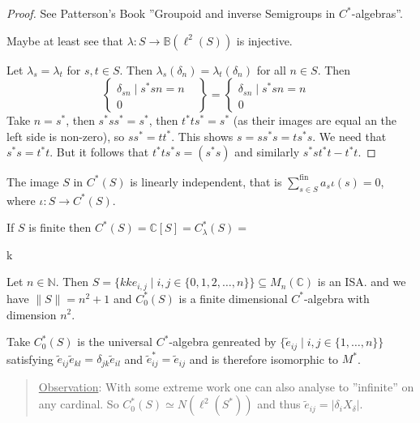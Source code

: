 \documentclass[a4paper]{article}
\begin{document}
\begin{proof}
	See Patterson's Book ''Groupoid and inverse Semigroups in $C^*$-algebras''.

	Maybe at least see that $\lambda: S \to \mathds{B}(\ell^2(S))$ is injective.

	Let $\lambda_s = \lambda_t$ for $s,t \in S$.
	Then $\lambda_s (\delta_n) = \lambda_t(\delta_n)$ for all $n \in S$.
	Then
	\begin{equation*}
		\left\{ \begin{matrix}
			\delta_{sn} \mid s^*sn = n \\ 0 & 
		\end{matrix}\right\} = \left\{ \begin{matrix}
			\delta_{sn} \mid s^*sn = n \\ 0 & 
		\end{matrix} \right.
	\end{equation*}	
	Take $n = s^*$, then $s^* s s^* = s^*$, then $t^*ts^* = s^*$ (as their images are equal an the left side is non-zero), so $ss^* = tt^*$.
	This shows $s = ss^*s= t s^* s$.
	We need that $s^*s = t^*t$.
	But it follows that $t^* t s^* s = (s^* s)$ and similarly $s^*s t^*t - t^* t$.
\end{proof}

\begin{corollary}
	The image $S$ in $C^*(S)$ is linearly independent, that is $\sum_{s \in S}^\mathrm{fin} a_s \iota(s) = 0$, where $\iota: S \to C^*(S)$.
\end{corollary}

\begin{corollary}
	If $S$ is finite then $C^*(S) = \mathds{C}[S] = C_\lambda^*(S) = $ 
\end{corollary}k

\begin{example}
	Let $n \in \mathds{N}$.
	Then $S = \{kke_{i,j} \mid i,j \in \{0, 1, 2, \dots,n   \} \}\subseteq M_n(\mathds{C})$ is an ISA. and we have $\|S\| = n^2 + 1$ and $C_0^*(S)$ is a finite dimensional $C^*$-algebra with dimension $n^2$.

	Take $C_0^*(S)$ is the universal $C^*$-algebra genreated by $\{\tilde{e}_{ij} \mid i,j \in \{1, \dots, n\}\}$ satisfying $\tilde{e}_{ij} \tilde{e}_{kl} = \delta_{jk} \tilde{e}_{il}$ and $\tilde{e}_{ij}^* = \tilde{e}_{ij}$ and is therefore isomorphic to $M^*$.

	\begin{quote}
		\underline{Observation}: With some extreme work one can also analyse to ''infinite'' on any cardinal.
		So $C_0^*(S) \simeq N(\ell^2(S^*))$ and thus $\tilde{e}_{ij} = |\delta_i X_\delta|$.
	\end{quote}
\end{example}
\end{document}

